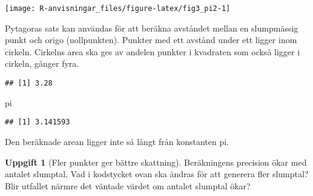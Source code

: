 \documentclass[
]{book}
\newenvironment{Shaded}{\begin{snugshade}}{\end{snugshade}}
\newcommand{\AttributeTok}[1]{\textcolor[rgb]{0.13,0.29,0.53}{#1}}
\newcommand{\DecValTok}[1]{\textcolor[rgb]{0.00,0.00,0.81}{#1}}
\newcommand{\FunctionTok}[1]{\textcolor[rgb]{0.13,0.29,0.53}{\textbf{#1}}}
\newcommand{\NormalTok}[1]{#1}
\newcommand{\OtherTok}[1]{\textcolor[rgb]{0.56,0.35,0.01}{#1}}
\newcommand{\SpecialCharTok}[1]{\textcolor[rgb]{0.81,0.36,0.00}{\textbf{#1}}}
\theoremstyle{definition}
\theoremstyle{definition}
\theoremstyle{definition}
\newtheorem{exercise}{Uppgift}[chapter]
\theoremstyle{definition}
\theoremstyle{remark}
\begin{document}
\begin{center}\texttt{[image: R-anvisningar\_files/figure-latex/fig3\_pi2-1]} \end{center}

Pytagoras sats kan användas för att beräkna avståndet mellan en slumpmässig punkt och origo (nollpunkten). Punkter med ett avstånd under ett ligger inom cirkeln. Cirkelns area ska ges av andelen punkter i kvadraten som också ligger i cirkeln, gånger fyra.

\begin{Shaded}
\end{Shaded}

\begin{verbatim}
## [1] 3.28
\end{verbatim}

\begin{Shaded}
\begin{Highlighting}[]
\NormalTok{pi}
\end{Highlighting}
\end{Shaded}

\begin{verbatim}
## [1] 3.141593
\end{verbatim}

Den beräknade arean ligger inte så långt från konstanten pi.

\begin{exercise}[Fler punkter ger bättre skattning]
Beräkningens precision ökar med antalet slumptal. Vad i kodstycket ovan ska ändras för att generera fler slumptal? Blir utfallet närmre det väntade värdet om antalet slumptal ökar?
\end{exercise}
\end{document}
